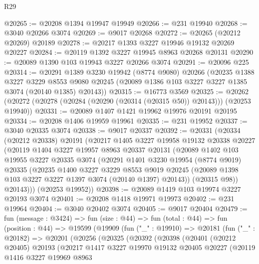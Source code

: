 \begin{lexlean}{R29}
\begin{coremodule}
@20265 := @20208 @1394 @19947 @19949
@20266 := @231 @19940
@20268 := @3040 @20266 @3074
@20269 := @9017 @20268
@20272 := @20265 (@20212 @20269) @20189
@20278 := @20217 @1393 @3227 @19946 @19132 @20269 @20227
@20284 := @20119 @1392 @3227 @19945 @8963 @20268 @20131
@20290 := @20089 @1390 @103 @19943 @3227 @20266 @3074
@20291 := @20096 @225
@20314 := @20291
    @1389
    @3230
    @19942
    (@8774 @9080)
    @20266
    (@20235
      @1388
      @3227
      @3229
      @8553
      @9080
      @20245
      (@20089 @1386 @103 @3227 @3227 @1385 @3074 (@20140 @1385) @20143))
@20315 := @16773 @3569
@20325 := @20262 (@20272 (@20278 (@20284 (@20290 (@20314 (@20315 @50)) @20143))) (@20253 @19940))
@20331 := @20089 @1407 @1421 @19962 @19976 @20191 @20195
@20334 := @20208 @1406 @19959 @19961
@20335 := @231 @19952
@20337 := @3040 @20335 @3074
@20338 := @9017 @20337
@20392 := @20331
    (@20334
      (@20212 @20338)
      @20191
      (@20217
        @1405
        @3227
        @19958
        @19132
        @20338
        @20227
        (@20119
          @1404
          @3227
          @19957
          @8963
          @20337
          @20131
          (@20089
            @1402
            @103
            @19955
            @3227
            @20335
            @3074
            (@20291
              @1401
              @3230
              @19954
              (@8774 @9019)
              @20335
              (@20235
                @1400
                @3227
                @3229
                @8553
                @9019
                @20245
                (@20089 @1398 @103 @3227 @3227 @1397 @3074 (@20140 @1397) @20143))
              (@20315 @98))
            @20143)))
      (@20253 @19952))
@20398 := @20089 @1419 @103 @19974 @3227 @20193 @3074
@20401 := @20208 @1418 @19971 @19973
@20402 := @231 @19964
@20404 := @3040 @20402 @3074
@20405 := @9017 @20404
@20479 := fun (message : @3424) =>
  fun (size : @44) =>
  fun (total : @44) =>
  fun (position : @44) =>
  @19599
    (@19909
      (fun ("_" : @19910) =>
      @20181
        (fun ("_" : @20182) =>
        @20201
          (@20256
            (@20325
              (@20392
                (@20398
                  (@20401
                    (@20212 @20405)
                    @20193
                    (@20217
                      @1417
                      @3227
                      @19970
                      @19132
                      @20405
                      @20227
                      (@20119
                        @1416
                        @3227
                        @19969
                        @8963

\end{coremodule}
\end{lexlean}
